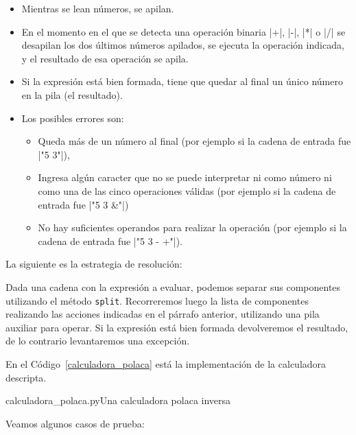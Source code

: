 \begin{itemize}
\item Mientras se lean números, se apilan.

\item En el momento en el que se detecta una operación binaria |+|,
|-|, |*| o |/| se desapilan los dos últimos
números apilados, se ejecuta la operación indicada, y el resultado de esa
operación se apila.

\item Si la expresión está bien formada, tiene que quedar al final un único
número en la pila (el resultado).

\item Los posibles errores son:

\begin{itemize}
\item Queda más de un número al final (por ejemplo si la cadena de entrada
fue |"5 3"|),

\item Ingresa algún caracter que no se puede interpretar ni como número ni como
una de las cinco operaciones válidas (por ejemplo si la cadena de entrada
fue |"5 3 &"|)

\item No hay suficientes operandos para realizar la operación (por ejemplo
si la cadena de entrada fue |"5 3 - +"|).
\end{itemize}
\end{itemize}

La siguiente es la estrategia de resolución:

Dada una cadena con la expresión a evaluar, podemos separar sus componentes
utilizando el método \lstinline!split!.  Recorreremos luego la lista de
componentes realizando las acciones indicadas en el párrafo anterior,
utilizando una pila auxiliar para operar. Si la expresión está bien formada
devolveremos el resultado, de lo contrario levantaremos una excepción.

En el Código~\ref{calculadora_polaca} está la implementación de la
calculadora descripta.

\begin{codigo}{\label{calculadora_polaca} calculadora\_polaca.py}{Una calculadora polaca inversa}

\end{codigo}

Veamos algunos casos de prueba:

